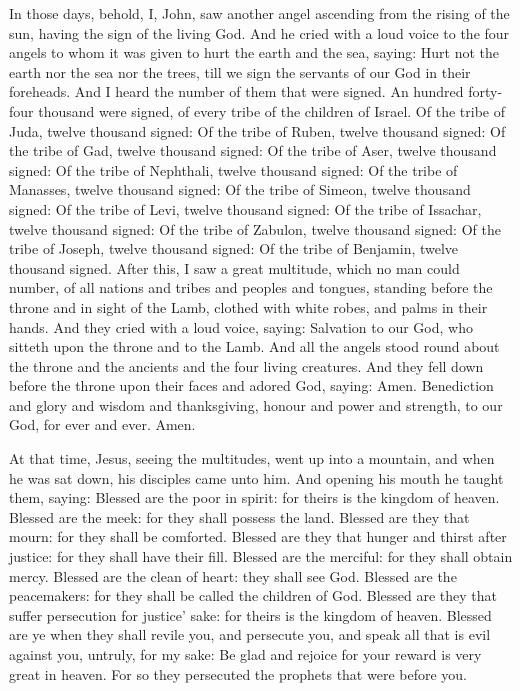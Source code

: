 



In those days, behold, I, John, saw another angel ascending from the rising of the sun,
having the sign of the living God. And he cried with a loud voice to the
four angels to whom it was given to hurt the earth and the sea,
saying: Hurt not the earth nor the sea nor the trees, till we sign
the servants of our God in their foreheads.
And I heard the number of them that were signed. An hundred forty-
four thousand were signed, of every tribe of the children of Israel.
Of the tribe of Juda, twelve thousand signed: Of the tribe of
Ruben, twelve thousand signed: Of the tribe of Gad, twelve thousand
signed:
Of the tribe of Aser, twelve thousand signed: Of the tribe of
Nephthali, twelve thousand signed: Of the tribe of Manasses, twelve
thousand signed:
Of the tribe of Simeon, twelve thousand signed: Of the tribe of
Levi, twelve thousand signed: Of the tribe of Issachar, twelve thousand
signed:
Of the tribe of Zabulon, twelve thousand signed: Of the tribe of
Joseph, twelve thousand signed: Of the tribe of Benjamin, twelve
thousand signed.
After this, I saw a great multitude, which no man could number, of
all nations and tribes and peoples and tongues, standing before the
throne and in sight of the Lamb, clothed with white robes, and palms in
their hands.
And they cried with a loud voice, saying: Salvation to our God,
who sitteth upon the throne and to the Lamb.
And all the angels stood round about the throne and the ancients
and the four living creatures. And they fell down before the throne upon
their faces and adored God,
saying: Amen. Benediction and glory and wisdom and thanksgiving,
honour and power and strength, to our God, for ever and ever. Amen.



At that time, Jesus, seeing the multitudes, went up into a mountain, and when he
was sat down, his disciples came unto him.
And opening his mouth he taught them, saying:
Blessed are the poor in spirit: for theirs is the kingdom of
heaven.
Blessed are the meek: for they shall possess the land.
Blessed are they that mourn: for they shall be comforted.
Blessed are they that hunger and thirst after justice: for they
shall have their fill.
Blessed are the merciful: for they shall obtain mercy.
Blessed are the clean of heart: they shall see God.
Blessed are the peacemakers: for they shall be called the children
of God.
Blessed are they that suffer persecution for justice' sake: for
theirs is the kingdom of heaven.
Blessed are ye when they shall revile you, and persecute you, and
speak all that is evil against you, untruly, for my sake:
Be glad and rejoice for your reward is very great in heaven. For
so they persecuted the prophets that were before you.


